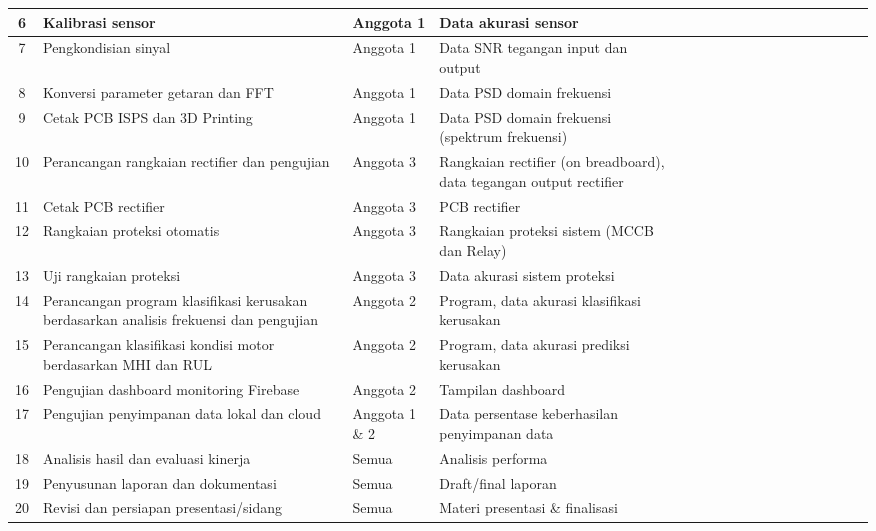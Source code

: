 \documentclass{elsinta}
\newcommand{\pk}{\cellcolor{ganttblue}\textcolor{white}{\checkmark}}
\begin{document}
\begin{longtable}{|c|p{2.5cm}|p{1.6cm}|p{2.4cm}|*{14}{c|}}
6 & Kalibrasi sensor & Anggota 1 & Data akurasi sensor &
& \pk & \pk & & & & & & & & & & & \\
\hline

7 & Pengkondisian sinyal & Anggota 1 & Data SNR tegangan input dan output &
& & \pk & \pk & & & & & & & & & & \\
\hline

8 & Konversi parameter getaran dan FFT & Anggota 1 & Data PSD domain frekuensi &
& & & & \pk & & & & & & & & & \\
\hline

9 & Cetak PCB ISPS dan 3D Printing & Anggota 1 & Data PSD domain frekuensi (spektrum frekuensi) &
& & & & & \pk & & & & & & & & \\
\hline

10 & Perancangan rangkaian rectifier dan pengujian & Anggota 3 & Rangkaian rectifier (on breadboard), data tegangan output rectifier &
& & \pk & \pk & & & & & & & & & & \\
\hline

11 & Cetak PCB rectifier & Anggota 3 & PCB rectifier &
& & & \pk & & & & & & & & & & \\
\hline

12 & Rangkaian proteksi otomatis & Anggota 3 & Rangkaian proteksi sistem (MCCB dan Relay) &
& & & & \pk & \pk & & & & & & & & \\
\hline

13 & Uji rangkaian proteksi & Anggota 3 & Data akurasi sistem proteksi &
& & & & & \pk & & & & & & & & \\
\hline

14 & Perancangan program klasifikasi kerusakan berdasarkan analisis frekuensi dan pengujian & Anggota 2 & Program, data akurasi klasifikasi kerusakan &
& & & & & \pk & \pk & \pk & & & & & & \\
\hline

15 & Perancangan klasifikasi kondisi motor berdasarkan MHI dan RUL & Anggota 2 & Program, data akurasi prediksi kerusakan &
& & & & & & & & \pk & \pk & & & & \\
\hline

16 & Pengujian dashboard monitoring Firebase & Anggota 2 & Tampilan dashboard &
& & & & & & & & & \pk & & & & \\
\hline

17 & Pengujian penyimpanan data lokal dan cloud & Anggota 1 \& 2 & Data persentase keberhasilan penyimpanan data &
& & & & & & & & & & \pk & & & \\
\hline

18 & Analisis hasil dan evaluasi kinerja & Semua & Analisis performa &
& & & & & & & & & & & \pk & \pk & \\
\hline

19 & Penyusunan laporan dan dokumentasi & Semua & Draft/final laporan &
& & & & & & & & & &  &\pk & & \\
\hline

20 & Revisi dan persiapan presentasi/sidang & Semua & Materi presentasi \& finalisasi &
& & & & & & & & & & & & \pk & \pk \\
\hline

\end{longtable}
\endgroup
\end{document}
